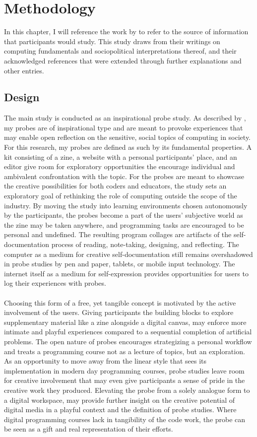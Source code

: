 \chapter{Methodology}
In this chapter, I will reference the work by \cite{soon:2020} to refer to the source of information that participants would study. This study draws from their writings on computing fundamentals and sociopolitical interpretations thereof, and their acknowledged references that were extended through further explanations and other entries.
\section{Design}
The main study is conducted as an inspirational probe study.  As described by \citep{mattelmäki:2005}, my probes are of inspirational type and are meant to provoke experiences that may enable open reflection on the sensitive, social topics of computing in society. For this research, my probes are defined as such by its fundamental properties. A kit consisting of a zine, a website with a personal participants' place, and an editor give room for exploratory opportunities the encourage individual and ambivalent confrontation with the topic. For the probes are meant to showcase the creative possibilities for both coders and educators, the study sets an exploratory goal of rethinking the role of computing outside the scope of the industry. By moving the study into learning environments chosen autonomously by the participants, the probes become a part of the users' subjective world as the zine may be taken anywhere, and programming tasks are encouraged to be personal and undefined. The resulting program collages are artifacts of the self-documentation process of reading, note-taking, designing, and reflecting. The computer as a medium for creative self-documentation still remains overshadowed in probe studies by pen and paper, tablets, or mobile input technology. The internet itself as a medium for self-expression provides opportunities for users to log their experiences with probes.  \\ \\
Choosing this form of a free, yet tangible concept is motivated by the active involvement of the users. Giving participants the building blocks to explore supplementary material like a zine alongside a digital canvas, may enforce more intimate and playful experiences compared to a sequential completion of artificial problems. The open nature of probes encourages strategizing a personal workflow and treats a programming course not as a lecture of topics, but an exploration. As an opportunity to move away from the linear style that sees its implementation in modern day programming courses, probe studies leave room for creative involvement that may even give participants a sense of pride in the creative work they produced. Elevating the probe from a solely analogue form to a digital workspace, may provide further insight on the creative potential of digital media in a playful context and the definition of probe studies. Where digital programming courses lack in tangibility of the code work, the probe can be seen as a gift and real representation of their efforts. \\
